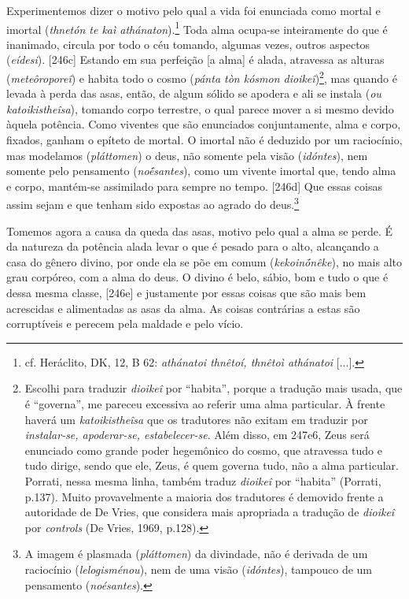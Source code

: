 Experimentemos dizer o motivo pelo qual a vida foi enunciada como mortal
e imortal (\emph{thnetón te kaì athánaton}).\footnote{cf. Heráclito, DK,
  12, B 62: \emph{athánatoi thnêtoí, thnêtoì athánatoi} {[}...{]}.} Toda
alma ocupa-se inteiramente do que é inanimado, circula por todo o céu
tomando, algumas vezes, outros aspectos (\emph{eídesi}). {[}246c{]}
Estando em sua perfeição {[}a alma{]} é alada, atravessa as alturas
(\emph{meteôroporeî}) e habita todo o cosmo (\emph{pánta tòn kósmon
dioikeî})\footnote{Escolhi para traduzir \emph{dioikeî} por ``habita'',
  porque a tradução mais usada, que é ``governa'', me pareceu excessiva
  ao referir uma alma particular. À frente haverá um
  \emph{katoikistheîsa} que os tradutores não exitam em traduzir por
  \emph{instalar-se, apoderar-se, estabelecer-se}. Além disso, em 247e6,
  Zeus será enunciado como grande poder hegemônico do cosmo, que
  atravessa tudo e tudo dirige, sendo que ele, Zeus, é quem governa
  tudo, não a alma particular. Porrati, nessa mesma linha, também traduz
  \emph{dioikeî} por ``habita'' (Porrati, p.137). Muito provavelmente a
  maioria dos tradutores é demovido frente a autoridade de De Vries, que
  considera mais apropriada a tradução de \emph{dioikeî} por
  \emph{controls} (De Vries, 1969, p.128).}, mas quando é levada à perda
das asas, então, de algum sólido se apodera e ali se instala (\emph{ou
katoikistheîsa}), tomando corpo terrestre, o qual parece mover a si
mesmo devido àquela potência. Como viventes que são enunciados
conjuntamente, alma e corpo, fixados, ganham o epíteto de mortal\emph{.}
O imortal não é deduzido por um raciocínio, mas modelamos
(\emph{pláttomen}) o deus, não somente pela visão (\emph{idóntes}), nem
somente pelo pensamento (\emph{noḗsantes}), como um vivente imortal que,
tendo alma e corpo, mantém-se assimilado para sempre no tempo.
{[}246d{]} Que essas coisas assim sejam e que tenham sido expostas ao
agrado do deus.\footnote{A imagem é plasmada (\emph{pláttomen}) da
  divindade, não é derivada de um raciocínio (\emph{lelogisménou}), nem
  de uma visão (\emph{idóntes}), tampouco de um pensamento
  (\emph{noésantes}).}

Tomemos agora a causa da queda das asas, motivo pelo qual a alma se
perde. É da natureza da potência alada levar o que é pesado para o alto,
alcançando a casa do gênero divino, por onde ela se põe em comum
(\emph{kekoinṓnêke}), no mais alto grau corpóreo, com a alma do deus. O
divino é belo, sábio, bom e tudo o que é dessa mesma classe, {[}246e{]}
e justamente por essas coisas que são mais bem acrescidas e alimentadas
as asas da alma. As coisas contrárias a estas são corruptíveis e perecem
pela maldade e pelo vício.

